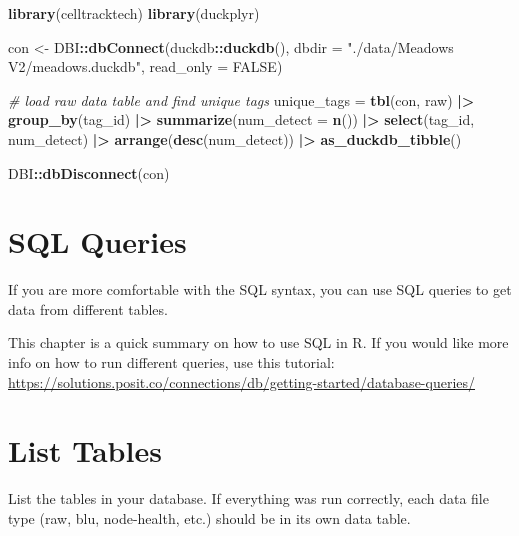 \documentclass[
]{book}
\newenvironment{Shaded}{\begin{snugshade}}{\end{snugshade}}
\newcommand{\AttributeTok}[1]{\textcolor[rgb]{0.13,0.29,0.53}{#1}}
\newcommand{\CommentTok}[1]{\textcolor[rgb]{0.56,0.35,0.01}{\textit{#1}}}
\newcommand{\ConstantTok}[1]{\textcolor[rgb]{0.56,0.35,0.01}{#1}}
\newcommand{\FunctionTok}[1]{\textcolor[rgb]{0.13,0.29,0.53}{\textbf{#1}}}
\newcommand{\NormalTok}[1]{#1}
\newcommand{\OtherTok}[1]{\textcolor[rgb]{0.56,0.35,0.01}{#1}}
\newcommand{\SpecialCharTok}[1]{\textcolor[rgb]{0.81,0.36,0.00}{\textbf{#1}}}
\newcommand{\StringTok}[1]{\textcolor[rgb]{0.31,0.60,0.02}{#1}}
\begin{document}
\begin{Shaded}
\begin{Highlighting}[]
\FunctionTok{library}\NormalTok{(celltracktech)}
\FunctionTok{library}\NormalTok{(duckplyr)}

\NormalTok{con }\OtherTok{\textless{}{-}}\NormalTok{ DBI}\SpecialCharTok{::}\FunctionTok{dbConnect}\NormalTok{(duckdb}\SpecialCharTok{::}\FunctionTok{duckdb}\NormalTok{(), }
                      \AttributeTok{dbdir =} \StringTok{"./data/Meadows V2/meadows.duckdb"}\NormalTok{, }
                      \AttributeTok{read\_only =} \ConstantTok{FALSE}\NormalTok{)}

\CommentTok{\# load raw data table and find unique tags}
\NormalTok{unique\_tags }\OtherTok{=} \FunctionTok{tbl}\NormalTok{(con, }\StringTok{\textquotesingle{}raw\textquotesingle{}}\NormalTok{) }\SpecialCharTok{|\textgreater{}} 
  \FunctionTok{group\_by}\NormalTok{(tag\_id) }\SpecialCharTok{|\textgreater{}}
  \FunctionTok{summarize}\NormalTok{(}\AttributeTok{num\_detect =} \FunctionTok{n}\NormalTok{()) }\SpecialCharTok{|\textgreater{}}
  \FunctionTok{select}\NormalTok{(tag\_id, num\_detect) }\SpecialCharTok{|\textgreater{}}
  \FunctionTok{arrange}\NormalTok{(}\FunctionTok{desc}\NormalTok{(num\_detect)) }\SpecialCharTok{|\textgreater{}}
  \FunctionTok{as\_duckdb\_tibble}\NormalTok{()}

\NormalTok{DBI}\SpecialCharTok{::}\FunctionTok{dbDisconnect}\NormalTok{(con)}
\end{Highlighting}
\end{Shaded}

\section{SQL Queries}\label{sql-queries}

If you are more comfortable with the SQL syntax, you can use SQL queries to get data from different tables.

This chapter is a quick summary on how to use SQL in R. If you would like more info on how to run different queries, use this tutorial: \url{https://solutions.posit.co/connections/db/getting-started/database-queries/}

\section{List Tables}\label{list-tables}

List the tables in your database. If everything was run correctly, each data file type (raw, blu, node-health, etc.) should be in its own data table.
\end{document}
